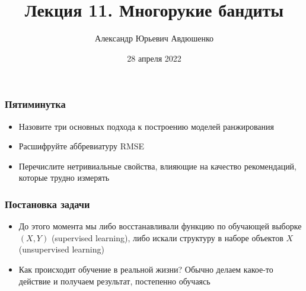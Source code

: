 \documentclass[fullscreen=true, bookmarks=true, hyperref={pdfencoding=unicode}]{beamer}
\title{Лекция 11. Многорукие бандиты}
\author{Александр Юрьевич Авдюшенко}
\institute{МКН СПбГУ}
\date{28 апреля 2022}
\begin{document}

\begin{frame}
\transdissolve[duration=0.2]
\titlepage
\end{frame}


\begin{frame}
  \frametitle{Пятиминутка}
  \begin{itemize}
    \item Назовите три основных подхода к построению моделей ранжирования
    \item Расшифруйте аббревиатуру RMSE
    \item Перечислите нетривиальные свойства, влияющие на качество рекомендаций, которые трудно измерять
  \end{itemize}
\end{frame}


\begin{frame}
  \frametitle{Постановка задачи}

  \begin{itemize}
    \item До этого момента мы либо восстанавливали функцию по обучающей выборке $(X, Y)$ (supervised learning), либо искали структуру в наборе объектов $X$ (unsupervised learning)
    \item Как происходит обучение в реальной жизни? Обычно делаем какое-то действие и получаем результат, постепенно обучаясь
  \end{itemize}
\end{frame}
\end{document}
